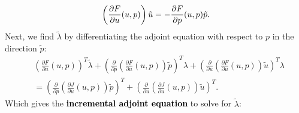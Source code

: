 \begin{equation}
    \color{black}{\left(\frac{\partial F}{\partial u}(u,p)\right) \tilde{u} = - \frac{\partial F}{\partial p}(u,p) \tilde{p}.}
\end{equation}
Next, we find $\tilde{\lambda}$ by differentiating the adjoint equation with respect to $p$ in the direction $\tilde{p}$:
\begin{equation}\begin{aligned}
    &\left(\frac{\partial F}{\partial u}(u,p)\right)^T \tilde{\lambda} + \left(\frac{\partial}{\partial p}\left(\frac{\partial F}{\partial u}(u,p)\right)\tilde{p}\right)^T \lambda + \left(\frac{\partial}{\partial u}\left(\frac{\partial F}{\partial u}(u,p)\right)\tilde{u}\right)^T \lambda \\
    &=  \left(\frac{\partial}{\partial p}\left(\frac{\partial J}{\partial u}(u,p)\right)\tilde{p}\right)^T + \left(\frac{\partial}{\partial u}\left(\frac{\partial J}{\partial u}(u,p)\right)\tilde{u}\right)^T.
    \end{aligned}
\end{equation}
Which gives the \textcolor{black}{\textbf{incremental adjoint equation}} to solve for $\tilde{\lambda}$:

